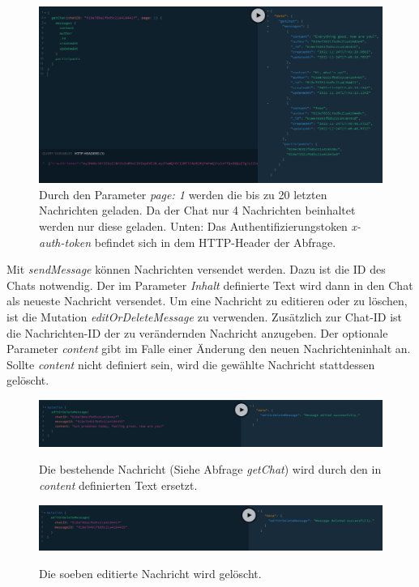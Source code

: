 \begin{figure}
	\centering
    \includegraphics[width=\textwidth]{sources/graphiql_getChat.png}
	\caption{Durch den Parameter \textit{page: 1} werden die bis zu 20 letzten Nachrichten geladen. Da der Chat nur 4 Nachrichten beinhaltet werden nur diese geladen. Unten: Das Authentifizierungstoken \textit{x-auth-token} befindet sich in dem HTTP-Header der Abfrage.}
	\label{fig:gql:7}
\end{figure}

Mit \textit{sendMessage} können Nachrichten versendet werden. Dazu ist die ID des Chats notwendig.
Der im Parameter \textit{Inhalt} definierte Text wird dann in den Chat als neueste Nachricht versendet.
Um eine Nachricht zu editieren  oder zu löschen, ist die Mutation \textit{editOrDeleteMessage} zu verwenden.
Zusätzlich zur Chat-ID ist die Nachrichten-ID der zu verändernden Nachricht anzugeben. Der optionale Parameter \textit{content} gibt im Falle einer Änderung den neuen Nachrichteninhalt an.
Sollte \textit{content} nicht definiert sein, wird die gewählte Nachricht stattdessen gelöscht. 

\begin{figure}
	\centering
    \includegraphics[width=\textwidth]{sources/graphiql_editMessage.png}\cite{}
	\caption{Die bestehende Nachricht (Siehe Abfrage \textit{getChat}) wird durch den in \textit{content} definierten Text ersetzt.}
	\label{fig:gql:8}
\end{figure}

\begin{figure}
	\centering
    \includegraphics[width=\textwidth]{sources/graphiql_deleteMessage.png}\cite{}
	\caption{Die soeben editierte Nachricht wird gelöscht.}
	\label{fig:gql:9}
\end{figure}

